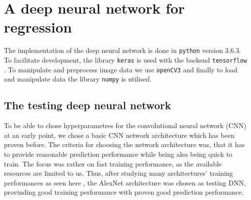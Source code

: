 \documentclass[10pt,a4paper,twoside,journal]{IEEEtran}
\begin{document}



\section{A deep neural network for regression}
The implementation of the deep neural network is done in \texttt{python} version 3.6.3. To facilitate development, the library \texttt{keras} \cite{chollet2015keras} is used with the backend \texttt{tensorflow} \cite{tensorflow2015-whitepaper}. To manipulate and preprocess image data we use \texttt{openCV3} \cite{opencv_library} and finally to load and manipulate data the library \texttt{numpy} \cite{5725236} is utilised. 

\subsection{The testing deep neural network}
\label{ssc:testing-dnn}
To be able to chose hyperparametres for the convolutional neural network (CNN) at an early point, we chose a basic CNN network architecture which has been proven before. The criteria for choosing the network architecture was, that it has to provide reasonable prediction performance while being also being quick to train. The focus was rather on fast training performance, as the available resources are limited to us. Thus, after studying many architectures' training performances as seen here \cite{jjohnson-cnn-benchmarks}, the AlexNet \cite{alexnet2012imagenet} architecture was chosen as testing DNN, provinding good training performance with proven good prediction performance. \\
\end{document}
